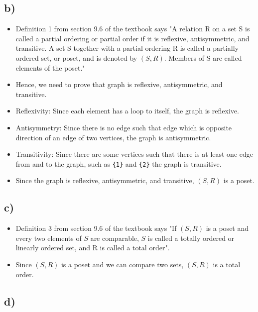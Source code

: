 \documentclass[11pt]{article}
\begin{document}
\subsection*{b)}
    \begin{itemize}
        \item Definition 1 from section 9.6 of the textbook says "A relation R on a set S is called a partial ordering or partial order if it is reflexive, antisymmetric, and transitive. A set S together with a partial ordering R is called a partially ordered set, or poset, and is denoted by $(S, R)$. Members of S are called elements of the poset."
        \item Hence, we need to prove that graph is reflexive, antisymmetric, and transitive.
        \item Reflexivity: Since each element has a loop to itself, the graph is reflexive. 
        \item Antisymmetry: Since there is no edge such that edge which is opposite direction of an edge of two vertices, the graph is antisymmetric.
        \item Transitivity: Since there are some vertices such that there is at least one edge from and to the graph, such as \texttt{\{1\}} and \texttt{\{2\}} the graph is transitive.
        \item Since the graph is reflexive, antisymmetric, and transitive, $(S, R)$ is a poset.
    \end{itemize}{}

\subsection*{c)}
    \begin{itemize}
        \item Definition 3 from section 9.6 of the textbook says "If $(S, R)$ is a poset and every two elements of $S$ are comparable, $S$ is called a totally ordered or linearly ordered set, and R is called a total order".
        \item Since $(S, R)$ is a poset and we can compare two sets, $(S, R)$ is a total order.
    \end{itemize}{}

\subsection*{d)}
\end{document}
